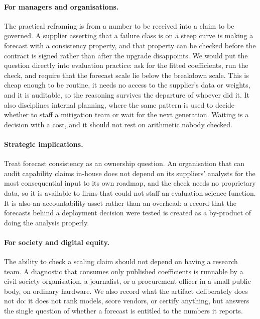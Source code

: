 \documentclass[11pt]{article}
\begin{document}
\paragraph{For managers and organisations.}
The practical reframing is from a number to be received into a claim to be governed.
A supplier asserting that a failure class is on a steep curve is making a forecast
with a consistency property, and that property can be checked before the contract
is signed rather than after the upgrade disappoints. We would put the question
directly into evaluation practice: ask for the fitted coefficients, run the check,
and require that the forecast scale lie below the breakdown scale. This is cheap
enough to be routine, it needs no access to the supplier's data or weights, and it
is auditable, so the reasoning survives the departure of whoever did it. It also
disciplines internal planning, where the same pattern is used to decide whether to
staff a mitigation team or wait for the next generation. Waiting is a decision with
a cost, and it should not rest on arithmetic nobody checked.

\paragraph{Strategic implications.}
Treat forecast consistency as an ownership question. An organisation that can audit
capability claims in-house does not depend on its suppliers' analysts for the most
consequential input to its own roadmap, and the check needs no proprietary data, so
it is available to firms that could not staff an evaluation science function. It is
also an accountability asset rather than an overhead: a record that the forecasts
behind a deployment decision were tested is created as a by-product of doing the
analysis properly.

\paragraph{For society and digital equity.}
The ability to check a scaling claim should not depend on having a research team. A
diagnostic that consumes only published coefficients is runnable by a civil-society
organisation, a journalist, or a procurement officer in a small public body, on
ordinary hardware. We also record what the artifact deliberately does not do: it
does not rank models, score vendors, or certify anything, but answers the single
question of whether a forecast is entitled to the numbers it reports.
\end{document}
